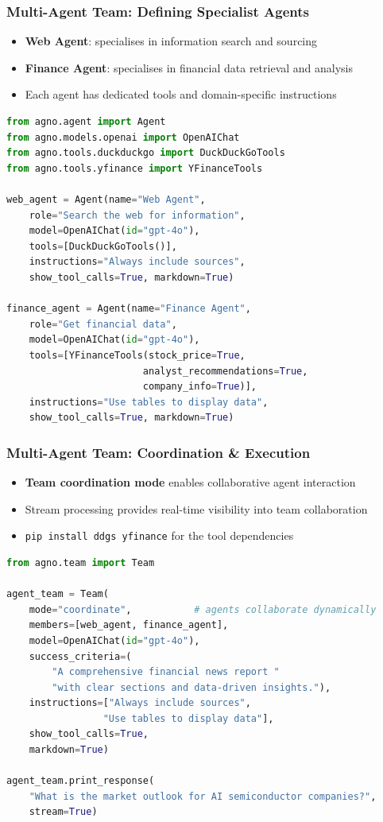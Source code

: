 \begin{frame}[fragile]\frametitle{Multi-Agent Team: Defining Specialist Agents}
      \begin{itemize}
        \item \textbf{Web Agent}: specialises in information search and sourcing
        \item \textbf{Finance Agent}: specialises in financial data retrieval and analysis
        \item Each agent has dedicated tools and domain-specific instructions
      \end{itemize}
\begin{lstlisting}[language=python, basicstyle=\tiny]
from agno.agent import Agent
from agno.models.openai import OpenAIChat
from agno.tools.duckduckgo import DuckDuckGoTools
from agno.tools.yfinance import YFinanceTools

web_agent = Agent(name="Web Agent",
    role="Search the web for information",
    model=OpenAIChat(id="gpt-4o"),
    tools=[DuckDuckGoTools()],
    instructions="Always include sources",
    show_tool_calls=True, markdown=True)

finance_agent = Agent(name="Finance Agent",
    role="Get financial data",
    model=OpenAIChat(id="gpt-4o"),
    tools=[YFinanceTools(stock_price=True,
                        analyst_recommendations=True,
                        company_info=True)],
    instructions="Use tables to display data",
    show_tool_calls=True, markdown=True)
\end{lstlisting}
\end{frame}

\begin{frame}[fragile]\frametitle{Multi-Agent Team: Coordination \& Execution}
      \begin{itemize}
        \item \textbf{Team coordination mode} enables collaborative agent interaction
        \item Stream processing provides real-time visibility into team collaboration
        \item \texttt{pip install ddgs yfinance} for the tool dependencies
      \end{itemize}
\begin{lstlisting}[language=python, basicstyle=\tiny]
from agno.team import Team

agent_team = Team(
    mode="coordinate",           # agents collaborate dynamically
    members=[web_agent, finance_agent],
    model=OpenAIChat(id="gpt-4o"),
    success_criteria=(
        "A comprehensive financial news report "
        "with clear sections and data-driven insights."),
    instructions=["Always include sources",
                 "Use tables to display data"],
    show_tool_calls=True,
    markdown=True)

agent_team.print_response(
    "What is the market outlook for AI semiconductor companies?",
    stream=True)
\end{lstlisting}
\end{frame}

